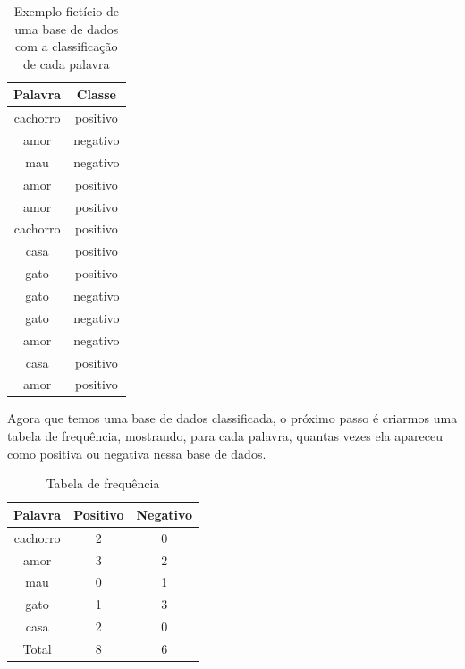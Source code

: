 \documentclass[
article,			%
12pt,				%
a4paper,			%
english,			%
brazil,				%
sumario=tradicional,
twoside
]{abntex2}
\begin{document}
	\begin{table}[!h]
		\caption{Exemplo fictício de uma base de dados com a classificação de cada palavra}
		\label{tab: baseDados1}
		\centering
		
		\begin{tabular}{|c|c|} \hline
			\textbf{Palavra} & \textbf{Classe} \\
			\hline
		
			cachorro	& positivo \\
			amor &	negativo \\
			mau	& negativo \\
			amor & positivo \\
			amor &	positivo \\
			cachorro	& positivo \\
			casa &	positivo \\
			gato	& positivo \\
			gato	& negativo \\
			gato	& negativo \\
			amor & 	negativo \\
			casa	& positivo \\
			amor	& positivo \\
			
			\hline
			
		\end{tabular}
			
	\end{table}

	
	Agora que temos uma base de dados classificada, o próximo passo é criarmos uma tabela de frequência, mostrando, para cada palavra, quantas vezes ela apareceu como positiva ou negativa nessa base de dados.
	
	\begin{table}[h]
		\caption{Tabela de frequência}
		\label{tab: tabelaFrequencia}
		\centering
		
		\begin{tabular}{|c|c|c|} \hline
			\textbf{Palavra} & \textbf{Positivo} & \textbf{Negativo} \\
			\hline
			cachorro	& 2 & 0 \\
			amor & 3 & 2 \\
			mau & 0 & 1 \\
			gato & 1 & 3 \\
			casa & 2 & 0 \\
			\hline
			Total & 8 & 6 \\
			\hline
			
		\end{tabular}
		
	\end{table}
	
\end{document}
